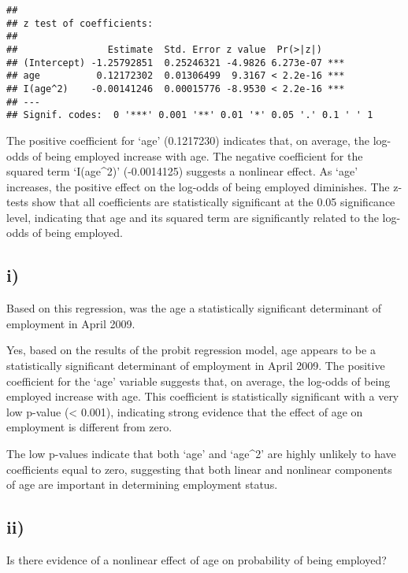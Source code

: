 \documentclass[
]{article}
\begin{document}
\begin{verbatim}
## 
## z test of coefficients:
## 
##                Estimate  Std. Error z value  Pr(>|z|)    
## (Intercept) -1.25792851  0.25246321 -4.9826 6.273e-07 ***
## age          0.12172302  0.01306499  9.3167 < 2.2e-16 ***
## I(age^2)    -0.00141246  0.00015776 -8.9530 < 2.2e-16 ***
## ---
## Signif. codes:  0 '***' 0.001 '**' 0.01 '*' 0.05 '.' 0.1 ' ' 1
\end{verbatim}

The positive coefficient for `age' (0.1217230) indicates that, on
average, the log-odds of being employed increase with age. The negative
coefficient for the squared term `I(age\^{}2)' (-0.0014125) suggests a
nonlinear effect. As `age' increases, the positive effect on the
log-odds of being employed diminishes. The z-tests show that all
coefficients are statistically significant at the 0.05 significance
level, indicating that age and its squared term are significantly
related to the log-odds of being employed.

\hypertarget{i-1}{%
\subsection{i)}\label{i-1}}

Based on this regression, was the age a statistically significant
determinant of employment in April 2009. \vspace{1em}

Yes, based on the results of the probit regression model, age appears to
be a statistically significant determinant of employment in April 2009.
The positive coefficient for the `age' variable suggests that, on
average, the log-odds of being employed increase with age. This
coefficient is statistically significant with a very low p-value
(\textless{} 0.001), indicating strong evidence that the effect of age
on employment is different from zero.

The low p-values indicate that both `age' and `age\^{}2' are highly
unlikely to have coefficients equal to zero, suggesting that both linear
and nonlinear components of age are important in determining employment
status.

\hypertarget{ii-1}{%
\subsection{ii)}\label{ii-1}}

Is there evidence of a nonlinear effect of age on probability of being
employed? \vspace{1em}
\end{document}
